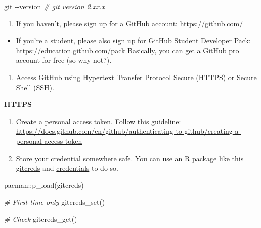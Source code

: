 \documentclass[
]{book}
\newenvironment{Shaded}{\begin{snugshade}}{\end{snugshade}}
\newcommand{\AttributeTok}[1]{\textcolor[rgb]{0.77,0.63,0.00}{#1}}
\newcommand{\CommentTok}[1]{\textcolor[rgb]{0.56,0.35,0.01}{\textit{#1}}}
\newcommand{\FunctionTok}[1]{\textcolor[rgb]{0.00,0.00,0.00}{#1}}
\newcommand{\NormalTok}[1]{#1}
\newcommand{\SpecialCharTok}[1]{\textcolor[rgb]{0.00,0.00,0.00}{#1}}
\providecommand{\tightlist}{%
  \setlength{\itemsep}{0pt}\setlength{\parskip}{0pt}}
\begin{document}
\begin{Shaded}
\begin{Highlighting}[]
\FunctionTok{git} \AttributeTok{{-}{-}version} 
\CommentTok{\# git version 2.xx.x}
\end{Highlighting}
\end{Shaded}

\begin{enumerate}
\def\labelenumi{\arabic{enumi}.}
\setcounter{enumi}{1}
\tightlist
\item
  If you haven't, please sign up for a GitHub account: \url{https://github.com/}
\end{enumerate}

\begin{itemize}
\tightlist
\item
  If you're a student, please also sign up for GitHub Student Developer Pack: \url{https://education.github.com/pack} Basically, you can get a GitHub pro account for free (so why not?).
\end{itemize}

\begin{enumerate}
\def\labelenumi{\arabic{enumi}.}
\setcounter{enumi}{2}
\tightlist
\item
  Access GitHub using Hypertext Transfer Protocol Secure (HTTPS) or Secure Shell (SSH).
\end{enumerate}

\textbf{HTTPS}

\begin{enumerate}
\def\labelenumi{\arabic{enumi}.}
\item
  Create a personal access token. Follow this guideline: \url{https://docs.github.com/en/github/authenticating-to-github/creating-a-personal-access-token}
\item
  Store your credential somewhere safe. You can use an R package like this \href{https://gitcreds.r-lib.org/}{gitcreds} and \href{https://docs.ropensci.org/credentials/}{credentials} to do so.
\end{enumerate}

\begin{Shaded}
\begin{Highlighting}[]
\NormalTok{pacman}\SpecialCharTok{::}\FunctionTok{p\_load}\NormalTok{(gitcreds)}

\CommentTok{\# First time only }
\FunctionTok{gitcreds\_set}\NormalTok{()}

\CommentTok{\# Check }
\FunctionTok{gitcreds\_get}\NormalTok{()}
\end{Highlighting}
\end{Shaded}
\end{document}
